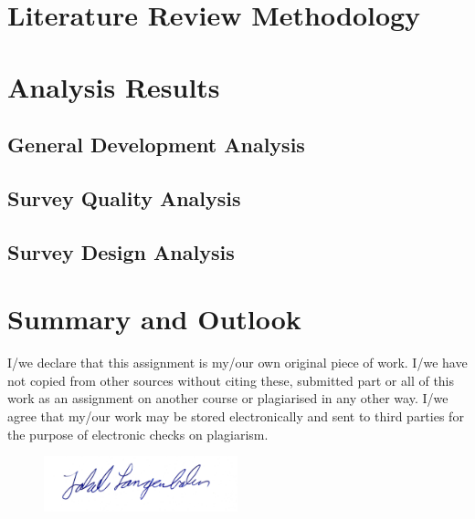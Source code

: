 \documentclass[12pt,a4paper]{article}
\begin{document}
\section{Literature Review Methodology}
\label{02_literature_review_methodology}


\section{Analysis Results}
\label{03_analysis_results}

\subsection{General Development Analysis}
\label{03_01_general_development_analysis}


\subsection{Survey Quality Analysis}
\label{03_02_survey_quality_analysis}


\subsection{Survey Design Analysis}
\label{03_04_survey_design_analysis}


\section{Summary and Outlook}
\label{04_summary_and_outlook}


\newpage
\printbibliography

\newpage

I/we declare that this assignment is my/our own original piece of work. I/we have not copied from other sources without citing these, submitted part or all of this work as an assignment on another course or plagiarised in any other way. I/we agree that my/our work may be stored electronically and sent to third parties for the purpose of electronic checks on plagiarism.

\begin{figure}[H]
    \centering
    \includegraphics[width=0.5\textwidth]{signature.JPG}
\end{figure}
\end{document}
